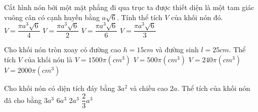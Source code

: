 \begin{ex}
	Cắt hình nón bởi một mặt phẳng đi qua trục ta được thiết diện là một tam giác vuông cân có cạnh huyền bằng $a\sqrt{6}$. Tính thể tích $V$ của khối nón đó. 
	\choice
	{\True $V=\dfrac{\pi a^3\sqrt{6}}{4}$}
	{$V=\dfrac{\pi a^3\sqrt{6}}{2}$}
	{$V=\dfrac{\pi a^3\sqrt{6}}{6}$}
	{$V=\dfrac{\pi a^3\sqrt{6}}{3}$}
\end{ex}
\begin{ex}
	Cho khối nón tròn xoay có đường cao $h=15 cm$ và đường sinh $l=25 cm$. Thể tích $V$ của khối nón là 
	\choice
	{$V=1500\pi\left(cm^3\right)$}
	{$V=500\pi\left(cm^3\right)$}
	{$V=240\pi\left(cm^3\right)$}
	{\True $V=2000\pi\left(cm^3\right)$}
\end{ex}      
\begin{ex}
	[Mã 103 - 2022]%
	Cho khối nón có diện tích đáy bằng $3a^2$ và chiều cao $2a$. Thể tích của khối nón đã cho bằng
	\choice
	{$3a^3$}
	{$6a^3$}
	{\True $2a^3$}
	{$\dfrac{2}{3}a^3$}
\end{ex}
